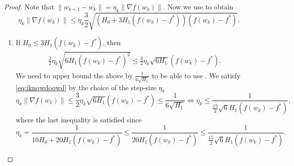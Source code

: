 \documentclass[a4paper,11pt]{article}
\newcommand{\1}{\mathbbm{1}}
\theoremstyle{plain}
\begin{document}
\begin{proof}
    Note that $\|w_{k+1} - w_k\| = \eta_k\|\nabla f(w_k)\|.$ Now we use  to obtain
    \[
    \eta_k\|\nabla f(w_k)\| \le \eta_k \frac{3}{2}\sqrt{(H_0 + 3H_1(f(w_k)-f^*))(f(w_k) -f^*)}.
    \]

    \begin{enumerate}
        \item If $H_0 \le 3H_1(f(w_k) - f^*)$, then 
        \begin{align}\label{eq:iknqwdoqwd}
        \frac{3}{2}\eta_k\sqrt{6H_1(f(w_k) - f^*)^2} \le \frac{3}{2}\eta_k \sqrt{6H_1}(f(w_k) - f^*).
        \end{align}
        We need to upper bound the above by $\frac{1}{6\sqrt{H_1}}$ to be able to use . We satisfy \eqref{eq:iknqwdoqwd} by the choice of the step-size $\eta_k$
        \[
        \eta_k\|\nabla f(w_k)\| \le \frac{3}{2}\eta_k \sqrt{6H_1}(f(w_k) -f^*) \le \frac{1}{6\sqrt{H_1}} \Leftrightarrow \eta_k \le \frac{1}{\frac{15}{2}\sqrt{6}H_1(f(w_k) - f^*)},
        \]
        where the last inequality is satisfied since 
        \[
        \eta_k = \frac{1}{10H_0 + 20H_1(f(w_k) - f^*)} \le \frac{1}{20H_1(f(w_k)-f^*)} \le \frac{1}{\frac{15}{2}\sqrt{6}H_1(f(w_k)-f^*)}.
        \]


\end{enumerate}
\end{proof}
\end{document}

